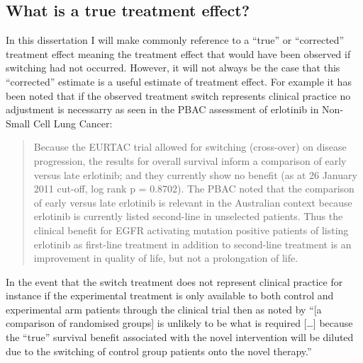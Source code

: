 \subsection{What is a true treatment effect?}
\label{S:chap_intro:whatest}
In this dissertation I will make commonly reference to a ``true'' or ``corrected'' treatment effect meaning the treatment effect that would have been observed if switching had not occurred. However, it will not always be the case that this ``corrected'' estimate is a useful estimate of treatment effect. For example it has been noted that if the observed treatment switch represents clinical practice no adjustment is necessarry as seen in \cite{PBAC2011} the PBAC assessment of erlotinib in Non-Small Cell Lung Cancer:
\begin{quote}
Because the EURTAC trial allowed for switching (cross-over) on disease progression, the results for overall survival inform a comparison of early versus late erlotinib; and they currently show no benefit (as at 26 January 2011 cut-off, log rank p = 0.8702).  The PBAC noted that the comparison of early versus late erlotinib is relevant in the Australian context because erlotinib is currently listed second-line in unselected patients.  Thus the clinical benefit for EGFR activating mutation positive patients of listing erlotinib as first-line treatment in addition to second-line treatment is an improvement in quality of life, but not a prolongation of life.
\end{quote}
In the event that the switch treatment does not represent clinical practice for instance if the experimental treatment is only available to both control and experimental arm patients through the clinical trial then  as noted by \cite{TSD16} ``[a comparison of randomised groups] is unlikely to be what is required [\ldots] because the ``true'' survival benefit associated with the novel intervention will be diluted due to the switching of control group patients onto the novel therapy.''  


